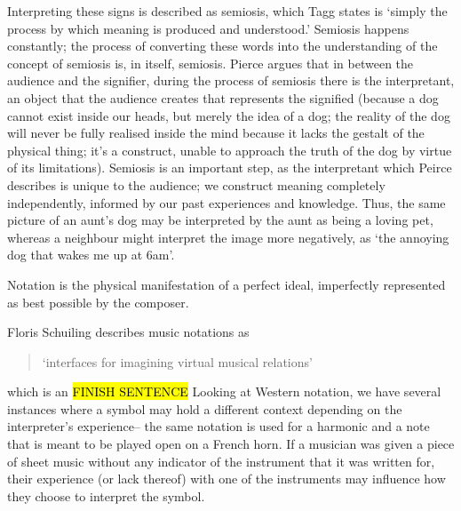 Interpreting these signs is described as semiosis, which Tagg states is `simply the process by which meaning is produced and understood.'\autocite[156]{taggMusicMeaningsModern2013}
Semiosis happens constantly; the process of converting these words into the understanding of the concept of semiosis is, in itself, semiosis. 
Pierce argues that in between the audience and the signifier, during the process of semiosis there is the interpretant, an object that the audience creates that represents the signified (because a dog cannot exist inside our heads, but merely the idea of a dog; the reality of the dog will never be fully realised inside the mind because it lacks the gestalt of the physical thing; 
it's a construct, unable to approach the truth of the dog by virtue of its limitations).
Semiosis is an important step, as the interpretant which Peirce describes is unique to the audience; we construct meaning completely independently, informed by our past experiences and knowledge.
Thus, the same picture of an aunt's dog may be interpreted by the aunt as being a loving pet, whereas a neighbour might interpret the image more negatively, as `the annoying dog that wakes me up at 6am'.

Notation is the physical manifestation of a perfect ideal, imperfectly represented as best possible by the composer.


Floris Schuiling describes music notations as \begin{quotation}
`interfaces for imagining virtual musical relations'
\end{quotation}
which is an \hl{FINISH SENTENCE}
Looking at Western notation, we have several instances where a symbol may hold a different context depending on the interpreter's experience-- 
the same notation is used for a harmonic and a note that is meant to be played open on a French horn.\autocite[]{schuilingNotationCulturesEthnomusicology2019}
If a musician was given a piece of sheet music without any indicator of the instrument that it was written for, their experience (or lack thereof) with one of the instruments may influence how they choose to interpret the symbol.

